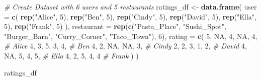 \documentclass[
]{article}
\newenvironment{Shaded}{\begin{snugshade}}{\end{snugshade}}
\newcommand{\AttributeTok}[1]{\textcolor[rgb]{0.13,0.29,0.53}{#1}}
\newcommand{\CommentTok}[1]{\textcolor[rgb]{0.56,0.35,0.01}{\textit{#1}}}
\newcommand{\ConstantTok}[1]{\textcolor[rgb]{0.56,0.35,0.01}{#1}}
\newcommand{\DecValTok}[1]{\textcolor[rgb]{0.00,0.00,0.81}{#1}}
\newcommand{\FunctionTok}[1]{\textcolor[rgb]{0.13,0.29,0.53}{\textbf{#1}}}
\newcommand{\NormalTok}[1]{#1}
\newcommand{\OtherTok}[1]{\textcolor[rgb]{0.56,0.35,0.01}{#1}}
\newcommand{\StringTok}[1]{\textcolor[rgb]{0.31,0.60,0.02}{#1}}
\begin{document}
\begin{Shaded}
\begin{Highlighting}[]
\CommentTok{\# Create Dataset with 6 users and 5 restaurants}
\NormalTok{ratings\_df }\OtherTok{\textless{}{-}} \FunctionTok{data.frame}\NormalTok{(}
  \AttributeTok{user =} \FunctionTok{c}\NormalTok{(}
    \FunctionTok{rep}\NormalTok{(}\StringTok{"Alice"}\NormalTok{, }\DecValTok{5}\NormalTok{),}
    \FunctionTok{rep}\NormalTok{(}\StringTok{"Ben"}\NormalTok{, }\DecValTok{5}\NormalTok{),}
    \FunctionTok{rep}\NormalTok{(}\StringTok{"Cindy"}\NormalTok{, }\DecValTok{5}\NormalTok{),}
    \FunctionTok{rep}\NormalTok{(}\StringTok{"David"}\NormalTok{, }\DecValTok{5}\NormalTok{),}
    \FunctionTok{rep}\NormalTok{(}\StringTok{"Ella"}\NormalTok{, }\DecValTok{5}\NormalTok{),}
    \FunctionTok{rep}\NormalTok{(}\StringTok{"Frank"}\NormalTok{, }\DecValTok{5}\NormalTok{)}
\NormalTok{  ),}
  \AttributeTok{restaurant =} \FunctionTok{rep}\NormalTok{(}\FunctionTok{c}\NormalTok{(}\StringTok{"Pasta\_Place"}\NormalTok{, }\StringTok{"Sushi\_Spot"}\NormalTok{, }\StringTok{"Burger\_Barn"}\NormalTok{, }\StringTok{"Curry\_Corner"}\NormalTok{, }\StringTok{"Taco\_Town"}\NormalTok{), }\DecValTok{6}\NormalTok{),}
  \AttributeTok{rating =} \FunctionTok{c}\NormalTok{(}
    \DecValTok{5}\NormalTok{, }\ConstantTok{NA}\NormalTok{, }\DecValTok{4}\NormalTok{, }\ConstantTok{NA}\NormalTok{, }\DecValTok{4}\NormalTok{,      }\CommentTok{\# Alice}
    \DecValTok{4}\NormalTok{, }\DecValTok{3}\NormalTok{, }\DecValTok{5}\NormalTok{, }\DecValTok{3}\NormalTok{, }\DecValTok{4}\NormalTok{,        }\CommentTok{\# Ben}
    \DecValTok{4}\NormalTok{, }\DecValTok{2}\NormalTok{, }\ConstantTok{NA}\NormalTok{, }\ConstantTok{NA}\NormalTok{, }\DecValTok{3}\NormalTok{,      }\CommentTok{\# Cindy}
    \DecValTok{2}\NormalTok{, }\DecValTok{2}\NormalTok{, }\DecValTok{3}\NormalTok{, }\DecValTok{1}\NormalTok{, }\DecValTok{2}\NormalTok{,        }\CommentTok{\# David}
    \DecValTok{4}\NormalTok{, }\ConstantTok{NA}\NormalTok{, }\DecValTok{5}\NormalTok{, }\DecValTok{4}\NormalTok{, }\DecValTok{5}\NormalTok{,       }\CommentTok{\# Ella}
    \DecValTok{4}\NormalTok{, }\DecValTok{2}\NormalTok{, }\DecValTok{5}\NormalTok{, }\DecValTok{4}\NormalTok{, }\DecValTok{4}         \CommentTok{\# Frank}
\NormalTok{  )}
\NormalTok{)}

\NormalTok{ratings\_df}
\end{Highlighting}
\end{Shaded}
\end{document}
